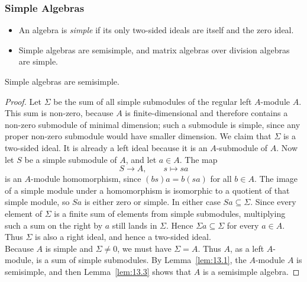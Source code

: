 \documentclass[../Odyssey_Project.tex]{subfiles}
\begin{document}
\subsubsection*{Simple Algebras}
\begin{itemize}
    \item An algebra is \emph{simple} if its only two-sided ideals are itself and the zero ideal.
    \item Simple algebras are semisimple, and matrix algebras over division algebras are simple.
\end{itemize}

\begin{lemma}
\label{lem:13.7}
Simple algebras are semisimple.
\end{lemma}
\begin{proof}
    Let $\Sigma$ be the sum of all simple submodules of the regular left $A$-module $A$. This sum is non-zero, because $A$ is finite-dimensional and therefore contains a non-zero submodule of minimal dimension; such a submodule is simple, since any proper non-zero submodule would have smaller dimension. We claim that $\Sigma$ is a two-sided ideal. It is already a left ideal because it is an $A$-submodule of $A$. Now let $S$ be a simple submodule of $A$, and let $a \in A$. The map
    \[
        S \to A, \qquad s \mapsto sa
    \]
    is an $A$-module homomorphism, since $(bs)a = b(sa)$ for all $b \in A$. The image of a simple module under a homomorphism is isomorphic to a quotient of that simple module, so $Sa$ is either zero or simple. In either case $Sa \subseteq \Sigma$. Since every element of $\Sigma$ is a finite sum of elements from simple submodules, multiplying such a sum on the right by $a$ still lands in $\Sigma$. Hence $\Sigma a \subseteq \Sigma$ for every $a \in A$. Thus $\Sigma$ is also a right ideal, and hence a two-sided ideal.\\
    Because $A$ is simple and $\Sigma \neq 0$, we must have $\Sigma = A$. Thus $A$, as a left $A$-module, is a sum of simple submodules. By Lemma~\ref{lem:13.1}, the $A$-module $A$ is semisimple, and then Lemma~\ref{lem:13.3} shows that $A$ is a semisimple algebra.
\end{proof}
\end{document}
